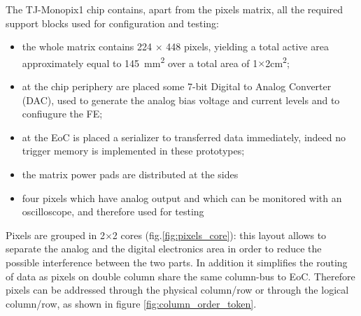 The TJ-Monopix1 chip contains, apart from the pixels matrix, all the required support blocks used for configuration and testing: 
\begin{itemize}
    \item  the whole matrix contains 224 $\times$ 448 pixels, yielding a total active area approximately equal to \SI{145}{mm\squared} over a total area of 1$\times$2\si{cm\squared};
    \item at the chip periphery are placed some 7-bit Digital to Analog Converter (DAC), used to generate the analog bias voltage and current levels and to confiugure the FE; 
    \item at the EoC is placed a serializer to transferred data immediately, indeed no trigger memory is implemented in these prototypes;
    \item the matrix power pads are distributed at the sides
    \item four pixels which have analog output and which can be monitored with an oscilloscope, and therefore used for testing
\end{itemize}    
Pixels are grouped in 2$\times$2 cores (fig.\ref{fig:pixels_core}): this layout allows to separate the analog and the digital electronics area in order to reduce the possible interference between the two parts. In addition it simplifies the routing of data as pixels on double column share the same column-bus to EoC. Therefore pixels can be addressed through the physical column/row or through the logical column/row, as shown in figure \ref{fig:column_order_token}.

